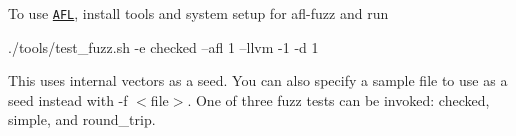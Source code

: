 To use \href{https://github.com/google/AFL}{\tt A\-F\-L}, install tools and system setup for {\ttfamily afl-\/fuzz} and run \begin{DoxyVerb}./tools/test_fuzz.sh -e checked --afl 1 --llvm -1 -d 1
\end{DoxyVerb}


This uses internal vectors as a seed. You can also specify a sample file to use as a seed instead with {\ttfamily -\/f $<$file$>$}. One of three fuzz tests can be invoked\-: checked, simple, and round\-\_\-trip. 